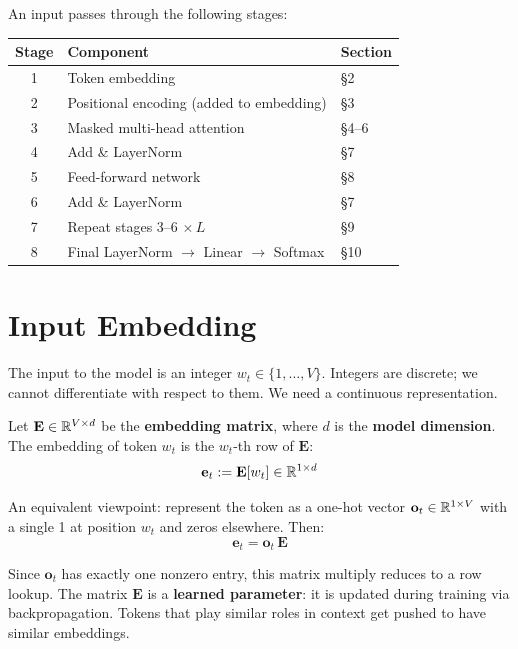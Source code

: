 \documentclass[main.tex]{subfiles}
\begin{document}
An input passes through the following stages:

\begin{center}
\renewcommand{\arraystretch}{1.4}
\begin{tabular}{c l l}
\hline
\textbf{Stage} & \textbf{Component} & \textbf{Section} \\
\hline
1 & Token embedding & \S2 \\
2 & Positional encoding (added to embedding) & \S3 \\
3 & Masked multi-head attention & \S4--6 \\
4 & Add \& LayerNorm & \S7 \\
5 & Feed-forward network & \S8 \\
6 & Add \& LayerNorm & \S7 \\
7 & Repeat stages 3--6 $\times\, L$ & \S9 \\
8 & Final LayerNorm $\to$ Linear $\to$ Softmax & \S10 \\
\hline
\end{tabular}
\end{center}

\needspace{0.33\textheight}
\section{Input Embedding}

The input to the model is an integer $w_t \in \{1, \ldots, V\}$. Integers are discrete; we cannot differentiate with respect to them. We need a continuous representation.

\begin{definition}
Let $\mathbf{E} \in \mathbb{R}^{V \times d}$ be the \textbf{embedding matrix}, where $d$ is the \textbf{model dimension}. The embedding of token $w_t$ is the $w_t$-th row of $\mathbf{E}$:
$$\mathbf{e}_t := \mathbf{E}[w_t] \in \mathbb{R}^{1 \times d}$$
\end{definition}

An equivalent viewpoint: represent the token as a one-hot vector $\mathbf{o}_t \in \mathbb{R}^{1 \times V}$ with a single 1 at position $w_t$ and zeros elsewhere. Then:
$$\mathbf{e}_t = \mathbf{o}_t \, \mathbf{E}$$

Since $\mathbf{o}_t$ has exactly one nonzero entry, this matrix multiply reduces to a row lookup. The matrix $\mathbf{E}$ is a \textbf{learned parameter}: it is updated during training via backpropagation. Tokens that play similar roles in context get pushed to have similar embeddings.
\end{document}
